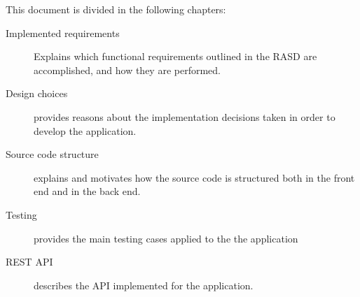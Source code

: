 This document is divided in the following chapters:
\begin{description}
\item[Implemented requirements] Explains which functional requirements outlined in the RASD are accomplished, and how they are performed.
\item[Design choices] provides reasons about the implementation decisions taken in order to develop the application.
\item[Source code structure] explains and motivates how the source code is structured both in the front end and in the back end.
\item[Testing] provides the main testing cases applied to the the application
\item[REST API] describes the API implemented for the application.
\end{description}